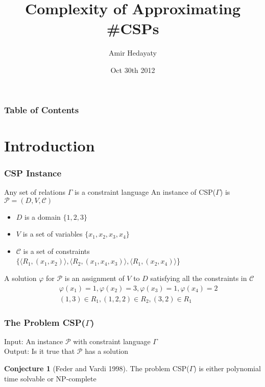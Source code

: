 \documentclass[a4paper,handout]{beamer}
\author{Amir Hedayaty}
\title{Complexity of Approximating \#CSPs}
\institute{Simon Fraser University}
\date{Oct 30th 2012}
\theoremstyle{definition}
\newtheorem{conj}{Conjecture}
\begin{document}
\begin{frame}
\titlepage
\end{frame}

\begin{frame}
\frametitle{Table of Contents}
\tableofcontents
\end{frame}

\section{Introduction}

\begin{frame}
\frametitle{CSP Instance}
Any set of relations \(\Gamma\) is a \textcolor{mygreen}{constraint language}
\pause {}
\vskip 12pt
An instance of CSP(\(\Gamma\)) is \(\mathcal{P} = (D, V, \mathcal{C})\)
\begin{itemize}
\item \(D\) is a domain  {\(\{1,2,3\}\)}
\item \(V\) is a set of variables  {\(\{x_1,x_2,x_3,x_4\}\)}
\item \(\mathcal{C}\) is a set of constraints \\
 {\(\{\langle R_1, (x_1,x_2)\rangle, \langle R_2, (x_1, x_4, x_3)\rangle, \langle R_1, (x_2,x_4)\rangle \)\}}
\end{itemize}
\vskip 12pt
\pause %
\vskip 12pt

\pause
A \textcolor{mygreen}{solution} \(\varphi\) for \(\mathcal{P}\) is an assignment of \(V\) to \(D\) satisfying all the constraints in \(\mathcal{C}\)
\pause
\begin{eqnarray*}
&&\varphi(x_1)=1, \varphi(x_2)=3, \varphi(x_3)=1, \varphi(x_4)=2 \\
&&(1,3) \in R_1, (1,2,2) \in R_2, (3,2) \in R_1
\end{eqnarray*}
\end{frame}

\begin{frame}
\frametitle{The Problem CSP(\(\Gamma\))}
\begin{definition} 
Input: An instance \(\mathcal{P}\) with constraint language \(\Gamma\) \\
Output: Is it true that \(\mathcal{P}\) has a solution
\end{definition}
\vskip 24pt
\begin{conj} [Feder and Vardi 1998]
The problem CSP(\(\Gamma\)) is either polynomial time solvable or NP-complete
\end{conj}
\end{frame}
\end{document}
